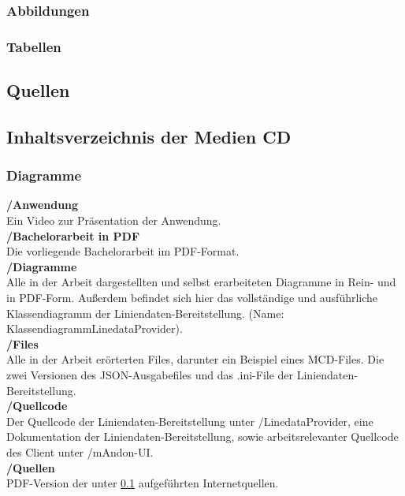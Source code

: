 \subsubsection{Abbildungen}
\makeatletter
{}%
\makeatother

\subsubsection{Tabellen}
\makeatletter
{}%
\makeatother

\subsection{Quellen}
\label{Quellen}

\printbibliography[notkeyword=Quelle,title={\subsubsection{Literatur}},heading=subbibliography] 

\subsection{Inhaltsverzeichnis der Medien CD}

\subsubsection{Diagramme}

\textbf{/Anwendung}\\
Ein Video zur Präsentation der Anwendung.\\

\textbf{/Bachelorarbeit in PDF}\\
Die vorliegende Bachelorarbeit im PDF-Format.\\

\textbf{/Diagramme}\\
Alle in der Arbeit dargestellten und selbst erarbeiteten Diagramme in Rein- und in PDF-Form. Außerdem befindet sich hier das vollständige und ausführliche Klassendiagramm der Liniendaten-Bereitstellung.
 (Name: KlassendiagrammLinedataProvider). \\

\textbf{/Files}\\
Alle in der Arbeit erörterten Files, darunter ein Beispiel eines MCD-Files. Die zwei Versionen des JSON-Ausgabefiles und das .ini-File der Liniendaten-Bereitstellung.\\

\textbf{/Quellcode}\\
Der Quellcode der Liniendaten-Bereitstellung unter /LinedataProvider, eine Dokumentation der Liniendaten-Bereitstellung, sowie arbeitsrelevanter Quellcode des Client unter /mAndon-UI.\\

\textbf{/Quellen}\\
PDF-Version der unter \ref{Quellen} aufgeführten Internetquellen.\\

\newpage

